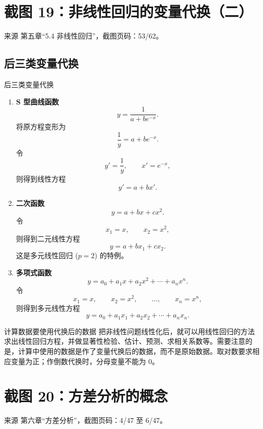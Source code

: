 \documentclass[UTF8,zihao=-4,fontset=fandol]{ctexart}
\begin{document}
\section{截图 19：非线性回归的变量代换（二）}

\begin{sourcebox}{来源}
第五章“5.4 非线性回归”，截图页码：53/62。
\end{sourcebox}

\subsection{后三类变量代换}

\begin{methodbox}{后三类变量代换}
\begin{enumerate}[label=(\arabic*),leftmargin=2.4em,start=6]
  \item \textbf{S 型曲线函数}
  \[
  y=\frac{1}{a+be^{-x}}.
  \]
  将原方程变形为
  \[
  \frac{1}{y}=a+be^{-x}.
  \]
  令
  \[
  y'=\frac{1}{y},\qquad x'=e^{-x},
  \]
  则得到线性方程
  \[
  y'=a+bx'.
  \]

  \item \textbf{二次函数}
  \[
  y=a+bx+cx^2.
  \]
  令
  \[
  x_1=x,\qquad x_2=x^2,
  \]
  则得到二元线性方程
  \[
  y=a+bx_1+cx_2.
  \]
  这是多元线性回归 ($p=2$) 的特例。

  \item \textbf{多项式函数}
  \[
  y=a_0+a_1x+a_2x^2+\cdots+a_nx^n.
  \]
  令
  \[
  x_1=x,\qquad x_2=x^2,\qquad \ldots,\qquad x_n=x^n,
  \]
  则得到多元线性方程
  \[
  y=a_0+a_1x_1+a_2x_2+\cdots+a_nx_n.
  \]
\end{enumerate}
\end{methodbox}

\begin{warnbox}{计算数据要使用代换后的数据}
把非线性问题线性化后，就可以用线性回归的方法求出线性回归方程，并做显著性检验、估计、预测、求相关系数等。需要注意的是，计算中使用的数据是作了变量代换后的数据，而不是原始数据。取对数要求相应变量为正；作倒数代换时，分母变量不能为 $0$。
\end{warnbox}

\section{截图 20：方差分析的概念}

\begin{sourcebox}{来源}
第六章“方差分析”，截图页码：4/47 至 6/47。
\end{sourcebox}
\end{document}
